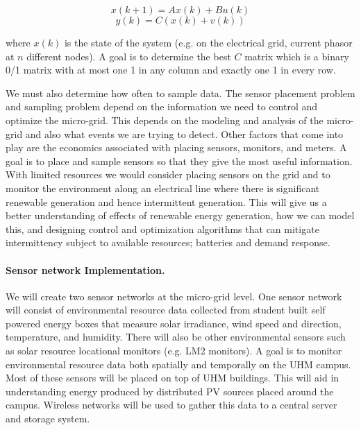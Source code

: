 \begin{displaymath}
x(k+1) = A x(k) + B u(k)
\end{displaymath}
\begin{displaymath}
y(k) = C (x(k) + v(k))
\end{displaymath}

\noindent where $x(k)$ is the state of the system (e.g. on the electrical grid,
current phasor at $n$ different nodes).  A goal is to determine the best
$C$ matrix which is a binary 0/1 matrix with at most one 1 in any column
and exactly one 1 in every row.

We must also determine how often to sample data.  The sensor placement
problem and sampling problem depend on the information we need to control
and optimize the micro-grid.  This depends on the modeling and analysis of
the micro-grid and also what events we are trying to detect.  Other factors
that come into play are the economics associated with placing sensors,
monitors, and meters.  A goal is to place and sample sensors so that they
give the most useful information.  With limited resources we would consider
placing sensors on the grid and to monitor the environment along an
electrical line where there is significant renewable generation and hence
intermittent generation.  This will give us a better understanding of
effects of renewable energy generation, how we can model this, and
designing control and optimization algorithms that can mitigate
intermittency subject to available resources; batteries and demand
response.

\paragraph{Sensor network Implementation.}

We will create two sensor networks at the micro-grid level.  One sensor
network will consist of environmental resource data collected from student
built self powered energy boxes that measure solar irradiance, wind speed
and direction, temperature, and humidity.  There will also be other
environmental sensors such as solar resource locational monitors (e.g. LM2
monitors).  A goal is to monitor environmental resource data both spatially
and temporally on the UHM campus.  Most of these sensors will be placed on
top of UHM buildings.  This will aid in understanding energy produced by
distributed PV sources placed around the campus.  Wireless networks will be
used to gather this data to a central server and storage system.

